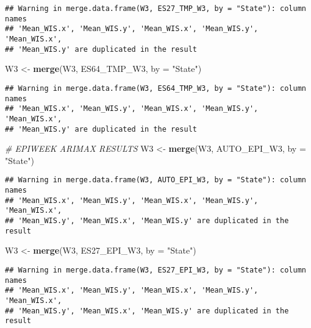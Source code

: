 \documentclass[
]{article}
\newenvironment{Shaded}{\begin{snugshade}}{\end{snugshade}}
\newcommand{\AttributeTok}[1]{\textcolor[rgb]{0.13,0.29,0.53}{#1}}
\newcommand{\CommentTok}[1]{\textcolor[rgb]{0.56,0.35,0.01}{\textit{#1}}}
\newcommand{\FunctionTok}[1]{\textcolor[rgb]{0.13,0.29,0.53}{\textbf{#1}}}
\newcommand{\NormalTok}[1]{#1}
\newcommand{\OtherTok}[1]{\textcolor[rgb]{0.56,0.35,0.01}{#1}}
\newcommand{\StringTok}[1]{\textcolor[rgb]{0.31,0.60,0.02}{#1}}
\begin{document}
\begin{verbatim}
## Warning in merge.data.frame(W3, ES27_TMP_W3, by = "State"): column names
## 'Mean_WIS.x', 'Mean_WIS.y', 'Mean_WIS.x', 'Mean_WIS.y', 'Mean_WIS.x',
## 'Mean_WIS.y' are duplicated in the result
\end{verbatim}

\begin{Shaded}
\begin{Highlighting}[]
\NormalTok{W3 }\OtherTok{\textless{}{-}} \FunctionTok{merge}\NormalTok{(W3, ES64\_TMP\_W3, }\AttributeTok{by =} \StringTok{"State"}\NormalTok{)}
\end{Highlighting}
\end{Shaded}

\begin{verbatim}
## Warning in merge.data.frame(W3, ES64_TMP_W3, by = "State"): column names
## 'Mean_WIS.x', 'Mean_WIS.y', 'Mean_WIS.x', 'Mean_WIS.y', 'Mean_WIS.x',
## 'Mean_WIS.y' are duplicated in the result
\end{verbatim}

\begin{Shaded}
\begin{Highlighting}[]
\CommentTok{\# EPIWEEK ARIMAX RESULTS}
\NormalTok{W3 }\OtherTok{\textless{}{-}} \FunctionTok{merge}\NormalTok{(W3, AUTO\_EPI\_W3, }\AttributeTok{by =} \StringTok{"State"}\NormalTok{)}
\end{Highlighting}
\end{Shaded}

\begin{verbatim}
## Warning in merge.data.frame(W3, AUTO_EPI_W3, by = "State"): column names
## 'Mean_WIS.x', 'Mean_WIS.y', 'Mean_WIS.x', 'Mean_WIS.y', 'Mean_WIS.x',
## 'Mean_WIS.y', 'Mean_WIS.x', 'Mean_WIS.y' are duplicated in the result
\end{verbatim}

\begin{Shaded}
\begin{Highlighting}[]
\NormalTok{W3 }\OtherTok{\textless{}{-}} \FunctionTok{merge}\NormalTok{(W3, ES27\_EPI\_W3, }\AttributeTok{by =} \StringTok{"State"}\NormalTok{)}
\end{Highlighting}
\end{Shaded}

\begin{verbatim}
## Warning in merge.data.frame(W3, ES27_EPI_W3, by = "State"): column names
## 'Mean_WIS.x', 'Mean_WIS.y', 'Mean_WIS.x', 'Mean_WIS.y', 'Mean_WIS.x',
## 'Mean_WIS.y', 'Mean_WIS.x', 'Mean_WIS.y' are duplicated in the result
\end{verbatim}
\end{document}
